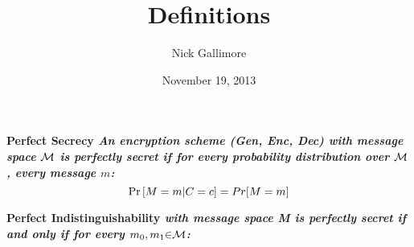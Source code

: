 \documentclass[]{article}
\begin{document}
\title{Definitions}
\author{Nick Gallimore}
\date{November 19, 2013}
\maketitle

\noindent

\newcommand{\PerfSec}{
\bf \noindent Perfect Secrecy\newline
\it An encryption scheme (Gen, Enc, Dec) with message space $\MsgSp$ is perfectly secret if for every probability distribution over $\MsgSp$, every message $m$:
$$\pr{M=m|C=c]=Pr[M=m}$$
\newline}\PerfSec

\newcommand{\PerfIndist}{
\bf \noindent Perfect Indistinguishability\newline
\it \Scheme with message space M is perfectly secret if and only if for every $\msg$:
\newline}\PerfIndist
\end{document}
